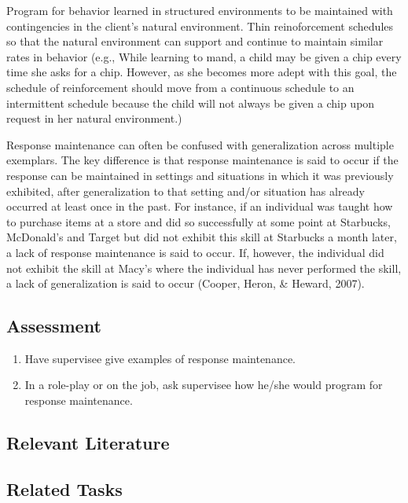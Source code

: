 Program for behavior learned in structured environments to be maintained with contingencies in the client's natural environment. Thin reinoforcement schedules so that the natural environment can support and continue to maintain similar rates in behavior (e.g., While learning to mand, a child may be given a chip every time she asks for a chip. However, as she becomes more adept with this goal, the schedule of reinforcement should move from a continuous schedule to an intermittent schedule because the child will not always be given a chip upon request in her natural environment.)

Response maintenance can often be confused with generalization across multiple exemplars. The key difference is that response maintenance is said to occur if the response can be maintained in settings and situations in which it was previously exhibited, after generalization to that setting and/or situation has already occurred at least once in the past.  For instance, if an individual was taught how to purchase items at a store and did so successfully at some point at Starbucks, McDonald's and Target but did not exhibit this skill at Starbucks a month later, a lack of response maintenance is said to occur. If, however, the individual did not exhibit the skill at Macy's where the individual has never performed the skill, a lack of generalization is said to occur (Cooper, Heron, \& Heward, 2007). 
%
\subsection{Assessment}
\begin{enumerate}
\item Have supervisee give examples of response maintenance. 
\item In a role-play or on the job, ask supervisee how he/she would program for response maintenance. 
%
\end{enumerate}
%
\subsection{Relevant Literature}
\begin{refsection}
\nocite{cooper2007applied,
        rusch1981toward}
\printbibliography[heading=none]
\end{refsection}
%
\subsection{Related Tasks}
\fourjSix{}\\
\fourjSeven{}\\
\fourjEight{}\\
\fourjEleven{}\\
%
\clearpage \section{\fourfSix{}}
